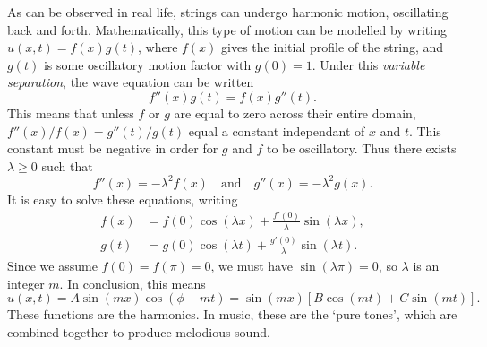 As can be observed in real life, strings can undergo harmonic motion, oscillating back and forth. Mathematically, this type of motion can be modelled by writing $u(x,t) = f(x) g(t)$, where $f(x)$ gives the initial profile of the string, and $g(t)$ is some oscillatory motion factor with $g(0) = 1$. Under this {\it variable separation}, the wave equation can be written
%
\[ f''(x) g(t) = f(x) g''(t). \]
%
This means that unless $f$ or $g$ are equal to zero across their entire domain, $f''(x)/f(x) = g''(t)/g(t)$ equal a constant independant of $x$ and $t$. This constant must be negative in order for $g$ and $f$ to be oscillatory. Thus there exists $\lambda \geq 0$ such that
%
\[ f''(x) = -\lambda^2 f(x)\quad\text{and}\quad g''(x) = -\lambda^2 g(x). \]
%
It is easy to solve these equations, writing
%
\begin{align*}
	f(x) &= f(0) \cos(\lambda x) + \frac{f'(0)}{\lambda} \sin(\lambda x),\\
	g(t) &= g(0) \cos(\lambda t) + \frac{g'(0)}{\lambda} \sin(\lambda t). 
\end{align*}
%
Since we assume $f(0) = f(\pi) = 0$, we must have $\sin(\lambda \pi) = 0$, so $\lambda$ is an integer $m$. In conclusion, this means
%
\[ u(x,t) = A \sin(mx) \cos(\phi + mt) = \sin(mx)[B \cos(mt) + C \sin(mt)]. \]
%
These functions are the harmonics. In music, these are the `pure tones', which are combined together to produce melodious sound.


